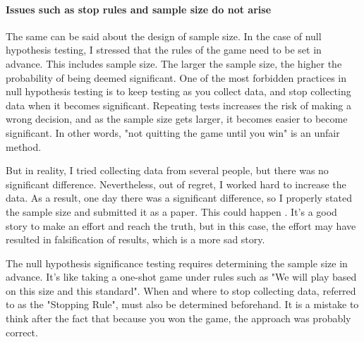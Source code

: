 \documentclass{ltjsbook}
\begin{document}
\paragraph{Issues such as  stop rules and sample size do not arise}
The same can be said about the design of sample size. In the case of null hypothesis testing, I stressed that the rules of the game need to be set in advance. This includes sample size. The larger the sample size, the higher the probability of being deemed significant. One of the most forbidden practices in null hypothesis testing is to keep testing as you collect data, and stop collecting data when it becomes significant. Repeating tests increases the risk of making a wrong decision, and as the sample size gets larger, it becomes easier to become significant. In other words, "not quitting the game until you win" is an unfair method.

But in reality, I tried collecting data from several people, but there was no significant difference. Nevertheless, out of regret, I worked hard to increase the data. As a result, one day there was a significant difference, so I properly stated the sample size and submitted it as a paper. This could happen . It's a good story to make an effort and reach the truth, but in this case, the effort may have resulted in falsification of results, which is a more sad story.

The null hypothesis significance testing requires determining the sample size in advance. It's like taking a one-shot game under rules such as "We will play based on this size and this standard". When and where to stop collecting data, referred to as the "Stopping Rule", must also be determined beforehand. It is a mistake to think after the fact that because you won the game, the approach was probably correct.
\end{document}
